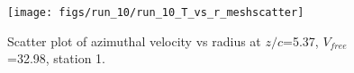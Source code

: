 \begin{figure}[H]
\centering
\texttt{[image: figs/run\_10/run\_10\_T\_vs\_r\_meshscatter]}
\caption{Scatter plot of azimuthal velocity vs radius at $z/c$=5.37, $V_{free}$=32.98, station 1.}
\label{fig:run_10_T_vs_r_meshscatter}
\end{figure}


